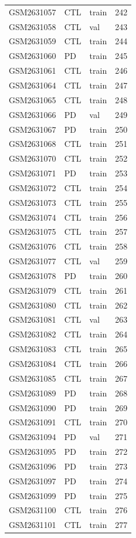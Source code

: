 \begin{footnotesize}
\begin{longtable}{llll}
GSM2631057 & CTL & train & 242 \\
GSM2631058 & CTL & val & 243 \\
GSM2631059 & CTL & train & 244 \\
GSM2631060 & PD & train & 245 \\
GSM2631061 & CTL & train & 246 \\
GSM2631064 & CTL & train & 247 \\
GSM2631065 & CTL & train & 248 \\
GSM2631066 & PD & val & 249 \\
GSM2631067 & PD & train & 250 \\
GSM2631068 & CTL & train & 251 \\
GSM2631070 & CTL & train & 252 \\
GSM2631071 & PD & train & 253 \\
GSM2631072 & CTL & train & 254 \\
GSM2631073 & CTL & train & 255 \\
GSM2631074 & CTL & train & 256 \\
GSM2631075 & CTL & train & 257 \\
GSM2631076 & CTL & train & 258 \\
GSM2631077 & CTL & val & 259 \\
GSM2631078 & PD & train & 260 \\
GSM2631079 & CTL & train & 261 \\
GSM2631080 & CTL & train & 262 \\
GSM2631081 & CTL & val & 263 \\
GSM2631082 & CTL & train & 264 \\
GSM2631083 & CTL & train & 265 \\
GSM2631084 & CTL & train & 266 \\
GSM2631085 & CTL & train & 267 \\
GSM2631089 & PD & train & 268 \\
GSM2631090 & PD & train & 269 \\
GSM2631091 & CTL & train & 270 \\
GSM2631094 & PD & val & 271 \\
GSM2631095 & PD & train & 272 \\
GSM2631096 & PD & train & 273 \\
GSM2631097 & PD & train & 274 \\
GSM2631099 & PD & train & 275 \\
GSM2631100 & CTL & train & 276 \\
GSM2631101 & CTL & train & 277 \\

\end{longtable}
\end{footnotesize}

